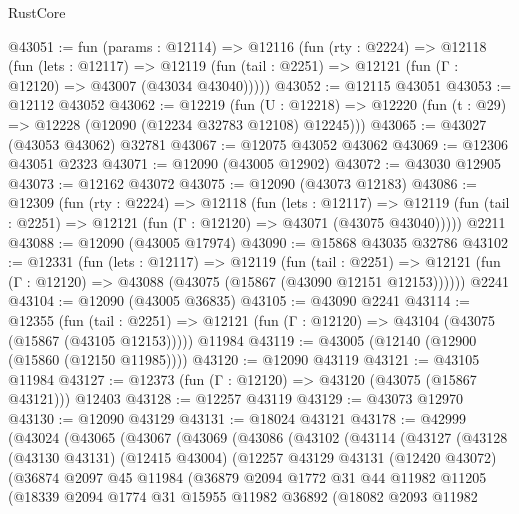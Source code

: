 \begin{lexlean}{RustCore}
\begin{coremodule}
@43051 := fun (params : @12114) =>
  @12116
    (fun (rty : @2224) =>
    @12118
      (fun (lets : @12117) =>
      @12119 (fun (tail : @2251) => @12121 (fun (Γ : @12120) => @43007 (@43034 @43040)))))
@43052 := @12115 @43051
@43053 := @12112 @43052
@43062 := @12219
    (fun (U : @12218) => @12220 (fun (t : @29) => @12228 (@12090 (@12234 @32783 @12108) @12245)))
@43065 := @43027 (@43053 @43062) @32781
@43067 := @12075 @43052 @43062
@43069 := @12306 @43051 @2323
@43071 := @12090 (@43005 @12902)
@43072 := @43030 @12905
@43073 := @12162 @43072
@43075 := @12090 (@43073 @12183)
@43086 := @12309
    (fun (rty : @2224) =>
    @12118
      (fun (lets : @12117) =>
      @12119 (fun (tail : @2251) => @12121 (fun (Γ : @12120) => @43071 (@43075 @43040)))))
    @2211
@43088 := @12090 (@43005 @17974)
@43090 := @15868 @43035 @32786
@43102 := @12331
    (fun (lets : @12117) =>
    @12119
      (fun (tail : @2251) =>
      @12121 (fun (Γ : @12120) => @43088 (@43075 (@15867 (@43090 @12151 @12153))))))
    @2241
@43104 := @12090 (@43005 @36835)
@43105 := @43090 @2241
@43114 := @12355
    (fun (tail : @2251) => @12121 (fun (Γ : @12120) => @43104 (@43075 (@15867 (@43105 @12153)))))
    @11984
@43119 := @43005 (@12140 (@12900 (@15860 (@12150 @11985))))
@43120 := @12090 @43119
@43121 := @43105 @11984
@43127 := @12373 (fun (Γ : @12120) => @43120 (@43075 (@15867 @43121))) @12403
@43128 := @12257 @43119
@43129 := @43073 @12970
@43130 := @12090 @43129
@43131 := @18024 @43121
@43178 := @42999
    (@43024
      (@43065
        (@43067
          (@43069
            (@43086
              (@43102
                (@43114
                  (@43127
                    (@43128
                      (@43130 @43131)
                      (@12415 @43004)
                      (@12257
                        @43129
                        @43131
                        (@12420 @43072)
                        (@36874
                          @2097
                          @45
                          @11984
                          (@36879
                            @2094
                            @1772
                            @31
                            @44
                            @11982
                            @11205
                            (@18339
                              @2094
                              @1774
                              @31
                              @15955
                              @11982
                              @36892
                              (@18082
                                @2093
                                @11982

\end{coremodule}
\end{lexlean}
